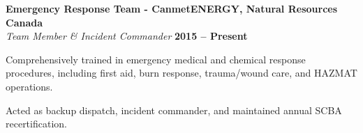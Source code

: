 \documentclass[margin,line]{resumecls}
\begin{document}
\begin{resume}
    \textbf{Emergency Response Team - CanmetENERGY, Natural Resources Canada}\\\vspace{1mm}%
    \textsl{Team Member \& Incident Commander} \hfill \textbf{2015 -- Present}\\\vspace{-5mm}%
    \begin{list2}
        \item Comprehensively trained in emergency medical and chemical response procedures, including first aid, burn response, trauma/wound care, and HAZMAT operations.
        \item Acted as backup dispatch, incident commander, and maintained annual SCBA recertification.
    \end{list2}





\end{resume}
\end{document}
